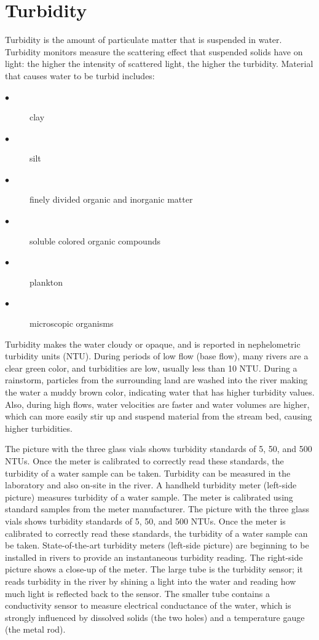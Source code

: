 \documentclass[a4paper]{article}
\begin{document}
\begin{minipage}[t]{0.45\textwidth}
\section*{\small Turbidity}
{\normalsize Turbidity is the amount of particulate matter that is suspended in water. Turbidity monitors measure the scattering effect that suspended solids have on light: the higher the intensity of scattered light, the higher the turbidity. Material that causes water to be turbid includes:
\begin{description}
  \item[$\bullet$ ] clay
  \item[$\bullet$ ] silt
   \item[$\bullet$ ] finely divided organic and inorganic matter
   \item[$\bullet$ ] soluble colored organic compounds
   \item[$\bullet$ ] plankton
   \item[$\bullet$ ] microscopic organisms
\end{description}
Turbidity makes the water cloudy or opaque, and is reported in nephelometric turbidity units (NTU). During periods of low flow (base flow), many rivers are a clear green color, and turbidities are low, usually less than 10 NTU. During a rainstorm, particles from the surrounding land are washed into the river making the water a muddy brown color, indicating water that has higher turbidity values. Also, during high flows, water velocities are faster and water volumes are higher, which can more easily stir up and suspend material from the stream bed, causing higher turbidities.\\ \par
The picture with the three glass vials shows turbidity standards of 5, 50, and 500 NTUs. Once the meter is calibrated to correctly read these standards, the turbidity of a water sample can be taken. Turbidity can be measured in the laboratory and also on-site in the river. A handheld turbidity meter (left-side picture) measures turbidity of a water sample. The meter is calibrated using standard samples from the meter manufacturer. The picture with the three glass vials shows turbidity standards of 5, 50, and 500 NTUs. Once the meter is calibrated to correctly read these standards, the turbidity of a water sample can be taken. State-of-the-art turbidity meters (left-side picture) are beginning to be installed in rivers to provide an instantaneous turbidity reading. The right-side picture shows a close-up of the meter. The large tube is the turbidity sensor; it reads turbidity in the river by shining a light into the water and reading how much light is reflected back to the sensor. The smaller tube contains a conductivity sensor to measure electrical conductance of the water, which is strongly influenced by dissolved solids (the two holes) and a temperature gauge (the metal rod).}
\end{minipage}
\hspace{.5cm}
\end{document}
